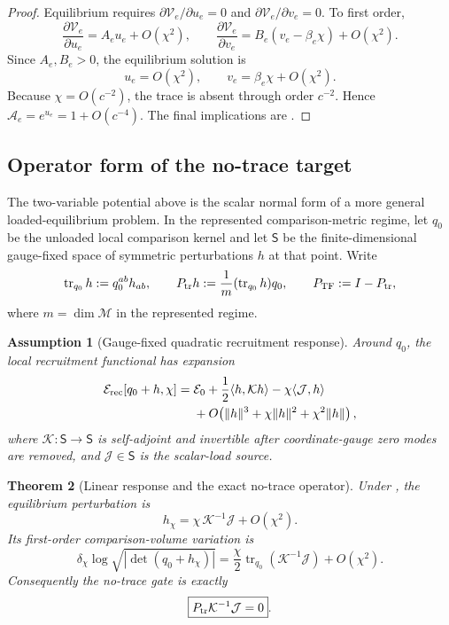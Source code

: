 \documentclass[11pt]{article}
\newtheorem{theorem}{Theorem}[section]
\newtheorem{assumption}[theorem]{Assumption}
\theoremstyle{remark}
\newcommand{\Mgeom}{\mathcal M}
\newcommand{\Ptr}{P_{\rm tr}}
\newcommand{\Ptf}{P_{\rm TF}}
\begin{document}
\begin{proof}
Equilibrium requires \(\partial\mathcal V_e/\partial u_e=0\) and \(\partial\mathcal V_e/\partial v_e=0\).  To first order,
\[
        \frac{\partial\mathcal V_e}{\partial u_e}=A_eu_e+O(\chi^2),
        \qquad
        \frac{\partial\mathcal V_e}{\partial v_e}=B_e(v_e-\beta_e\chi)+O(\chi^2).
\]
Since \(A_e,B_e>0\), the equilibrium solution is
\[
        u_e=O(\chi^2),
        \qquad
        v_e=\beta_e\chi+O(\chi^2).
\]
Because \(\chi=O(c^{-2})\), the trace is absent through order \(c^{-2}\).  Hence \(\mathcal A_e=e^{u_e}=1+O(c^{-4})\).  The final implications are .
\end{proof}

\subsection{Operator form of the no-trace target}
\label{sec:operator-no-trace}

The two-variable potential above is the scalar normal form of a more general loaded-equilibrium problem.  In the represented comparison-metric regime, let $q_0$ be the unloaded local comparison kernel and let $\mathsf S$ be the finite-dimensional gauge-fixed space of symmetric perturbations $h$ at that point.  Write
\[
        \operatorname{tr}_{q_0}h:=q_0^{ab}h_{ab},
        \qquad
        \Ptr h:=\frac{1}{m}(\operatorname{tr}_{q_0}h)q_0,
        \qquad
        \Ptf:=I-\Ptr,
\]
where $m=\dim\Mgeom$ in the represented regime.

\begin{assumption}[Gauge-fixed quadratic recruitment response]
\label{ass:gauge-fixed-response-hessian}
Around $q_0$, the local recruitment functional has expansion
\[
\begin{aligned}
\mathcal E_{\rm rec}[q_0+h,\chi]
={}&\mathcal E_0
+\frac12\langle h,\mathcal K h\rangle
-\chi\langle\mathcal J,h\rangle \\
&+O\!\left(\|h\|^3+\chi\|h\|^2+\chi^2\|h\|\right),
\end{aligned}
\]
where $\mathcal K:\mathsf S\to\mathsf S$ is self-adjoint and invertible after coordinate-gauge zero modes are removed, and $\mathcal J\in\mathsf S$ is the scalar-load source.
\end{assumption}

\begin{theorem}[Linear response and the exact no-trace operator]
\label{thm:no-trace-operator}
Under , the equilibrium perturbation is
\[
        h_\chi=\chi\,\mathcal K^{-1}\mathcal J+O(\chi^2).
\]
Its first-order comparison-volume variation is
\[
        \delta_\chi\log\sqrt{|\det(q_0+h_\chi)|}
        =\frac{\chi}{2}\operatorname{tr}_{q_0}
        (\mathcal K^{-1}\mathcal J)+O(\chi^2).
\]
Consequently the no-trace gate is exactly
\[
        \boxed{\Ptr\mathcal K^{-1}\mathcal J=0}.
\]
\end{theorem}
\end{document}

